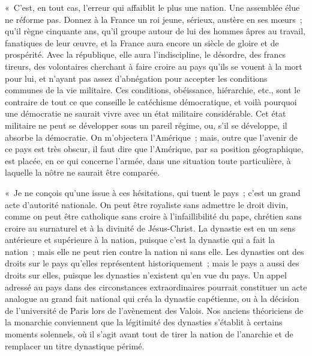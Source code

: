\documentclass[french,twoside]{book} %
\newenvironment{quoteblock}%
  {\begin{quoting}}
  {\end{quoting}}
\newenvironment{quotebar}{%
    \def\FrameCommand{{\color{rubric!10!}\vrule width 0.5em} \hspace{0.9em}}%
    \def\OuterFrameSep{\itemsep} %
    \MakeFramed {\advance\hsize-\width \FrameRestore}
  }%
  {%
    \endMakeFramed
  }
\renewenvironment{quoteblock}%
  {%
    \savenotes
    \setstretch{0.9}
    \normalfont
    \begin{quotebar}
  }
  {%
    \end{quotebar}
    \spewnotes
  }
\begin{document}
\begin{quoteblock}
 « C’est, en tout cas, l’erreur qui affaiblit le plus une nation. Une assemblée élue ne réforme pas. Donnez à la France un roi jeune, sérieux, austère en ses mœurs ; qu’il règne cinquante ans, qu’il groupe autour de lui des hommes âpres au travail, fanatiques de leur œuvre, et la France aura encore un siècle de gloire et de prospérité. Avec la république, elle aura l’indiscipline, le désordre, des francs tireurs, des volontaires cherchant à faire croire au pays qu’ils se vouent à la mort pour lui, et n’ayant pas assez d’abnégation pour accepter les conditions communes de la vie militaire. Ces conditions, obéissance, hiérarchie, etc., sont le contraire de tout ce que conseille le catéchisme démocratique, et voilà pourquoi une démocratie ne saurait vivre avec un état militaire considérable. Cet état militaire ne peut se développer sous un pareil régime, ou, s’il se développe, il absorbe la démocratie. On m’objectera l’Amérique ; mais, outre que l’avenir de ce pays est très obscur, il faut dire que l’Amérique, par sa position géographique, est placée, en ce qui concerne l’armée, dans une situation toute particulière, à laquelle la nôtre ne saurait être comparée.\par
 « Je ne conçois qu’une issue à ces hésitations, qui tuent le pays ; c’est un grand acte d’autorité nationale. On peut être royaliste sans admettre le droit divin, comme on peut être catholique sans croire à l’infaillibilité du pape, chrétien sans croire au surnaturel et à la divinité de Jésus-Christ. La dynastie est en un sens antérieure et supérieure à la nation, puisque c’est la dynastie qui a fait la nation ; mais elle ne peut rien contre la nation ni sans elle. Les dynasties ont des droits sur le pays qu’elles représentent historiquement ; mais le pays a aussi des droits sur elles, puisque les dynasties n’existent qu’en vue du pays. Un appel adressé au pays dans des circonstances extraordinaires pourrait constituer un acte analogue au grand fait national qui créa la dynastie capétienne, ou à la décision de l’université de Paris lors de l’avènement des Valois. Nos anciens théoriciens de la monarchie conviennent que la légitimité des dynasties s’établit à certains moments solennels, où il s’agit avant tout de tirer la nation de l’anarchie et de remplacer un titre dynastique périmé.\par

\end{quoteblock}
\end{document}
